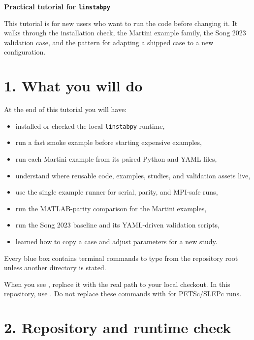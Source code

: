 \documentclass[11pt,a4paper]{article}
\newcommand{\code}[1]{\texttt{\detokenize{#1}}}
\begin{document}
{\Large\bfseries Practical tutorial for \texttt{linstabpy}\par}
\vspace{0.35em}

This tutorial is for new users who want to run the code before changing it. It walks through the installation check, the Martini example family, the Song 2023 validation case, and the pattern for adapting a shipped case to a new configuration.

\section*{1. What you will do}

At the end of this tutorial you will have:

\begin{itemize}[leftmargin=2em]
  \item installed or checked the local \texttt{linstabpy} runtime,
  \item run a fast smoke example before starting expensive examples,
  \item run each Martini example from its paired Python and YAML files,
  \item understand where reusable code, examples, studies, and validation assets live,
  \item use the single example runner for serial, parity, and MPI-safe runs,
  \item run the MATLAB-parity comparison for the Martini examples,
  \item run the Song 2023 baseline and its YAML-driven validation scripts,
  \item learned how to copy a case and adjust parameters for a new study.
\end{itemize}

\begin{notebox}
Every blue box contains terminal commands to type from the repository root unless another directory is stated.
\end{notebox}

\begin{warningbox}
When you see , replace it with the real path to your local checkout. In this repository, use \code{.venv/bin/python}. Do not replace these commands with \code{uv run} for PETSc/SLEPc runs.
\end{warningbox}

\section*{2. Repository and runtime check}
\end{document}
